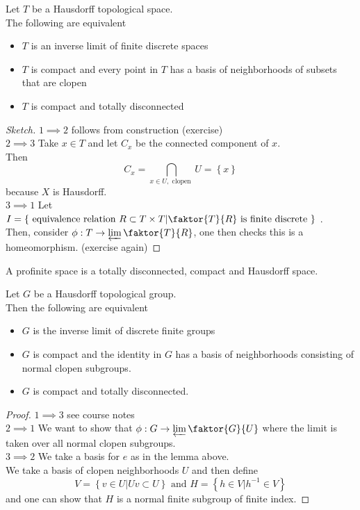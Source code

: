 \documentclass[../main.tex]{subfiles}
\begin{document}
\begin{lemma}
Let $T$ be a Hausdorff topological space.\\
The following are equivalent
\begin{itemize}
\item $T$ is an inverse limit of finite discrete spaces
\item $T$ is compact and every point in $T$ has a basis of neighborhoods of subsets that are clopen
\item $T$ is compact and totally disconnected
\end{itemize}
\end{lemma}
\begin{proof}[Sketch]
$1\implies 2$ follows from construction (exercise) \\
$2\implies 3$ Take $x\in T$ and let $C_x$ be the connected component of $x$.\\
Then
\[ 
C_x= \bigcap_{x\in U , \text{ clopen } } U = \left\{ x \right\} 
\]
because $X$ is Hausdorff.\\
$3\implies 1$ Let $ I= \left\{ \text{ equivalence relation } R \subset T\times T| \faktor{T}{R} \text{ is finite discrete }  \right\} $ .\\
Then, consider $\phi: T \to \varprojlim \faktor{T}{R}$, one then checks this is a homeomorphism. (exercise again) 
\end{proof}
\begin{defn}
A profinite space is a totally disconnected, compact and Hausdorff space.
\end{defn}
\begin{lemma}
Let $G$ be a Hausdorff topological group.\\
Then the following are equivalent
\begin{itemize}
\item $G$ is the inverse limit of discrete finite groups
\item $G$ is compact and the identity in $G$ has a basis of neighborhoods consisting of normal clopen subgroups.
\item $G$ is compact and totally disconnected.
\end{itemize}

\end{lemma}
\begin{proof}
$1\implies 3$ see course notes\\
$2\implies 1$ We want to show that $\phi: G \to \varprojlim \faktor{G}{U}$ where the limit is taken over all normal clopen subgroups.\\
$3\implies 2$ We take a basis for $e$ as in the lemma above.\\
We take a basis of clopen neighborhoods $U$ and then define 
\[ 
V= \left\{ v\in U | Uv \subset U \right\} \text{ and } H= \left\{ h \in V |h^{-1} \in V \right\} 
\]
and one can show that $H$ is a normal finite subgroup of finite index.
\end{proof}
\end{document}
